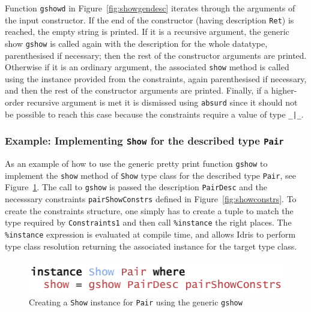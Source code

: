 \documentclass{ituthesis}
\newcommand{\ttconstructor}[1]{\textcolor{constructor-color}{\texttt{#1}}}
\newcommand{\tttype}[1]{\textcolor{type-color}{\texttt{#1}}}
\newcommand{\ttdec}[1]{\textcolor{declared-var-color}{\texttt{#1}}}
\newcommand{\ttliteral}[1]{\textcolor{literal-color}{\texttt{#1}}}
\theoremstyle{break}
\begin{document}
Function \ttdec{gshowd} in Figure~\ref{fig:showgendesc} iterates through the arguments of the input constructor.
If the end of the constructor (having description \ttconstructor{Ret}) is reached, the empty string is printed.
If it is a recursive argument, the generic show \ttdec{gshow} is called again with the description for the whole datatype, parenthesised if necessary; then the rest of the constructor arguments are printed.
Otherwise if it is an ordinary argument, the associated \ttdec{show} method is called using the instance provided from the constraints, again parenthesised if necessary, and then the rest of the constructor arguments are printed.
Finally, if a higher-order recursive argument is met it is dismissed using \ttdec{absurd} since it should not be possible to reach this case because the constraints require a value of type \tttype{\_|\_}.


\subsubsection{Example: Implementing \tttype{Show} for the described type \ttdec{Pair}}
\label{ssub:Example:ImplementingShowforPairs}
As an example of how to use the generic pretty print function \ttdec{gshow} to implement the \ttdec{show} method of \tttype{Show} type class for the described type \ttdec{Pair}, see Figure~\ref{fig:showinst}.
The call to \ttdec{gshow} is passed the description \ttdec{PairDesc} and the necesssary constraints \ttdec{pairShowConstrs} defined in Figure~\ref{fig:showconstrs}.
To create the constraints structure, one simply has to create a tuple to match the type required by \ttdec{Constraints1} and then call \ttliteral{\%instance} the right places.
The \ttliteral{\%instance} expression is evaluated at compile time, and allows Idris to perform type class resolution returning the associated instance for the target type class.

\begin{figure}[ht]
\begin{center}
    \includegraphics[scale=0.5]{Figures/GenericShowInstance.png}
\end{center}
\caption{Creating a \tttype{Show} instance for \ttdec{Pair} using the generic \ttdec{gshow}}
\label{fig:showinst}
\end{figure}
\end{document}
